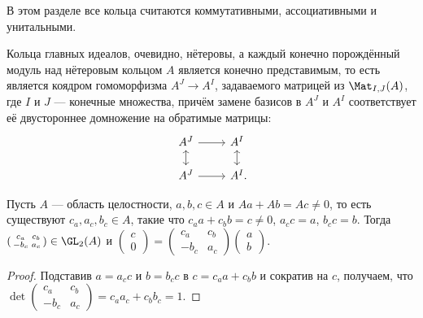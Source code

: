\documentclass[
	extrafontsizes,
	11pt,
	hyphens,
]{memoir}
\begin{document}
\begin{convention}
В этом разделе все кольца считаются коммутативными, ассоциативными и унитальными.
\end{convention}

\begin{observation}
\label{obs:modpid}
Кольца главных идеалов, очевидно, нётеровы,
а каждый конечно порождённый модуль над нётеровым кольцом \(A\) является конечно представимым, то есть является коядром гомоморфизма
\(A^J \to A^I\), задаваемого матрицей из \(\Mat_{I,J}(A)\), где \(I\) и \(J\) --- конечные множества, причём замене базисов в
\(A^J\) и \(A^I\) соответствует её двустороннее домножение на обратимые матрицы:
\begin{equation*}
\begin{tikzcd}[row sep = scriptsize]
    A^J \arrow{r} \arrow[leftrightarrow]{d} & A^I \arrow[leftrightarrow]{d} \\
    A^J \arrow{r} & A^I\mathrlap{.}
\end{tikzcd}
\label{eq:Am_to_An}
\end{equation*}
\end{observation}


\begin{lemma}
Пусть \(A\) --- область целостности, \(a,b,c \in A\) и \(Aa + Ab = Ac \neq 0\), то есть существуют \(c_a,a_c,b_c \in A\), такие что \(c_a a + c_b b = c \neq 0\), \(a_c c = a\), \(b_c c = b\).
\label{lem:PIDmatrix2}
Тогда
\(
(
\begin{smallmatrix}
    c_a & c_b \\
    -b_c & a_c
\end{smallmatrix}
)
\in
\GL_2(A)
\)
и
\(
(
\begin{smallmatrix}
    c \\
    0 
\end{smallmatrix}
)
=
(
\begin{smallmatrix}
    c_a & c_b \\
    -b_c & a_c
\end{smallmatrix}
)
(
\begin{smallmatrix}
    a \\
    b 
\end{smallmatrix}
)
\).
\end{lemma}

\begin{proof}
Подставив \(a = a_c c\) и \(b = b_c c\) в \(c = c_a a + c_b b\) и сократив на \(c\), получаем, что
\(
\det
(
\begin{smallmatrix}
    c_a & c_b \\
    -b_c & a_c
\end{smallmatrix}
)
= c_a a_c + c_b b_c
= 1
\).
\end{proof}
\end{document}
